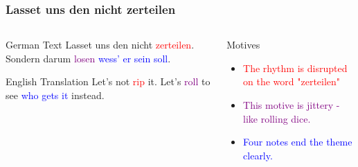 	\begin{frame}
		\frametitle{Lasset uns den nicht zerteilen}
		\begin{columns}[t]
		
		\begin{column}{0.5\textwidth}
		\begin{block}{German Text}
		Lasset uns den nicht \textcolor{red}{zerteilen}. Sondern darum \textcolor{purple}{losen} \textcolor{blue}{wess' er sein soll}.
		\end{block}
	
		\begin{block}{English Translation}
			Let's not \textcolor{red}{rip} it. Let's \textcolor{purple}{roll} to see \textcolor{blue}{who gets it} instead.
		\end{block}
		\end{column}
	
	
	\begin{column}{0.5\textwidth}
		\begin{block}{Motives}
			\begin{itemize}
				\item \textcolor{red}{The rhythm is disrupted on the word "zerteilen" }
				\item \textcolor{purple}{This motive is jittery - like rolling dice.}
				\item \textcolor{blue}{Four notes end the theme clearly.}
			\end{itemize}
		\end{block}
	\end{column}
	
	\end{columns}
		
	\end{frame}